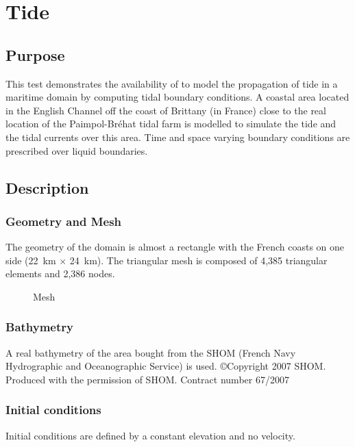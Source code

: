 \chapter{Tide}
%
%
\section{Purpose}

This test demonstrates the availability of  to model the
propagation of tide in a maritime domain by computing tidal
boundary conditions.
A coastal area located in the English Channel off the coast of
Brittany (in France) close to the real location of the Paimpol-Bréhat
tidal farm is modelled to simulate the tide and the tidal currents
over this area.
Time and space varying boundary conditions are prescribed over
liquid boundaries.
%
\section{Description}

\subsection{Geometry and Mesh}

The geometry of the domain is almost a rectangle with the French coasts on
one side (22~km $\times$ 24~km).
The triangular mesh is composed of 4,385 triangular elements and 2,386 nodes.

\begin{figure}[H]
 \centering
  \caption{Mesh}\label{fig:tide:mesh}
\end{figure}

\subsection{Bathymetry}
%
A real bathymetry of the area bought from the SHOM (French Navy
Hydrographic and Oceanographic Service) is used.
\copyright Copyright 2007 SHOM. Produced with the permission of SHOM.
Contract number 67/2007

\subsection{Initial conditions}
%
Initial conditions are defined by a constant elevation and no velocity.
%
